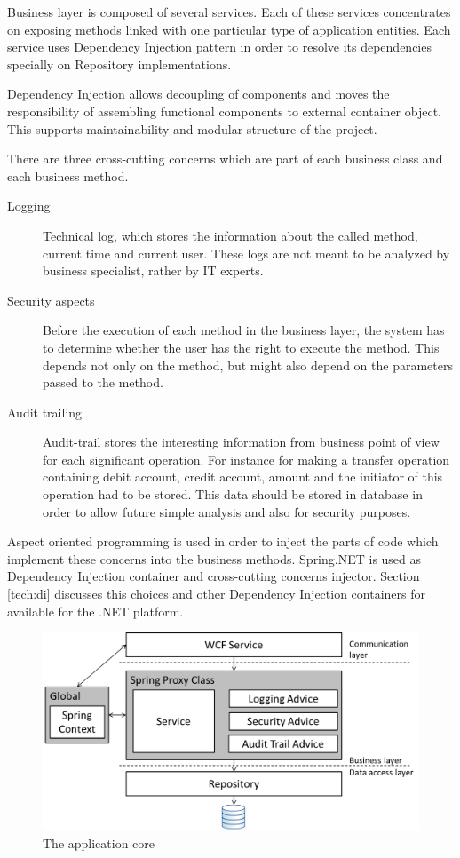 Business layer is composed of several services. Each of these services concentrates on exposing methods linked with one particular type of application entities. Each service uses Dependency Injection pattern in order to resolve its dependencies specially on Repository implementations.

Dependency Injection allows decoupling of components and moves the responsibility of assembling functional components to external container object. This supports maintainability and modular structure of the project.

There are three cross-cutting concerns which are part of each business class and each business method.

\begin{description}
	\item [Logging] Technical log, which stores the information about the called method, current time and current user. These logs are not meant to be analyzed by business specialist, rather by IT experts.
	\item [Security aspects] Before the execution of each method in the business layer, the system has to determine whether the user has the right to execute the method. This depends not only on the method, but might also depend on the parameters passed to the method.
	\item [Audit trailing] Audit-trail stores the interesting information from business point of view for each significant operation. For instance for making a transfer operation containing debit account, credit account, amount and the initiator of this operation had to be stored. This data should be stored in database in order to allow future simple analysis and also for security purposes.
\end{description}

Aspect oriented programming is used in order to inject the parts of code which implement these concerns into the business methods. Spring.NET is used as Dependency Injection container and cross-cutting concerns injector. Section \ref{tech:di} discusses this choices and other Dependency Injection containers for available for the .NET platform.

\begin{figure}[h]
\begin{center}
\includegraphics[width=14cm]{figures/business_layer}
\caption{The application core}
\label{fig:appcore}
\end{center}
\end{figure}


